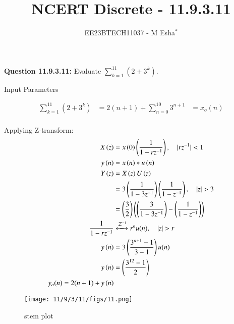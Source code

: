 \documentclass[journal,12pt,twocolumn]{IEEEtran}
\theoremstyle{remark}
\begin{document}

\vspace{3cm}

\title{NCERT Discrete - 11.9.3.11}
\author{EE23BTECH11037 - M Esha$^{*}$}

\maketitle
\newpage
\bigskip

\renewcommand{\thefigure}{\theenumi}
\renewcommand{\thetable}{\theenumi}

\vspace{3cm}
\textbf{Question 11.9.3.11:} 
Evaluate $\sum_{k=1}^{11} (2 + 3^k)$.

\solution
\begin{table}[h!]
  \centering
  
  \caption{Input Parameters}
    \label{tab:table1}
\end{table}

\begin{align}
\sum_{k=1}^{11} (2 + 3^k) 
&= 2(n+1) + \sum_{n=0}^{10}3^{n+1} &= x_o(n)\\
\end{align}

Applying Z-transform:
\begin{align}
X\brak{z} &= x\brak{0}\brak{\frac{1}{1-rz^{-1}}}, \quad{|rz^{-1}|<1} \\
y\brak{n} &= x\brak{n}*u\brak{n} \\
Y\brak{z} &= X\brak{z}U\brak{z}\\
&=3\brak{\frac{1}{1-3z^{-1}}}\brak{\frac{1}{1-z^{-1}}} ,\quad{|z|>3}\\
&=\brak{\frac{3}{2}}\brak{\brak{\frac{3}{1-3z^{-1}}}-\brak{\frac{1}{1-z^{-1}}}}\\
\frac{1}{1-rz^{-1}} &\xleftrightarrow{\mathcal{Z}^{-1}}  r^nu(n), \quad{|z|>r}\\
y\brak{n} &= 3\brak{\frac{3^{n+1}-1}{3-1}}u(n) \\
y\brak{n} &= \brak{\frac{3^{12}-1}{2}}\\
y_o(n)= 2(n+1)+y\brak{n}
\end{align}
\begin{figure}[h!]
    \centering
    \texttt{[image: 11/9/3/11/figs/11.png]}
    \caption{stem plot }
    \label{fig:1}
\end{figure}
\end{document}
